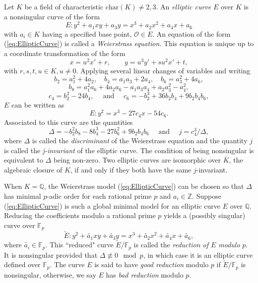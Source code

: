 Let $K$ be a field of characteristic $\text{char}(K) \neq 2,3$. An \textit{elliptic curve} $E$ over $K$ is a nonsingular curve of the form 
\begin{equation} \label{eq:EllipticCurve}
E: y^2 + a_1xy + a_3y = x^3 + a_2x^2 + a_4x + a_6
\end{equation}
with $a_i \in K$ having a specified base point, $\mathcal{O}\in E$. An equation of the form (\ref{eq:EllipticCurve}) is called a \textit{Weierstrass equation}. This equation is unique up to a coordinate transformation of the form
\[x = u^2x' + r, \quad\quad y = u^3y' + su^2x' + t, \]
with $r,s,t,u \in K, u\neq 0$. 
Applying several linear changes of variables and writing 
\[b_2 = a_1^2 + 4a_2, \quad b_4 = a_1a_3 + 2a_4, \quad b_6 = a_3^2 + 4a_6,\]
\[b_8 = a_1^2a_6 + 4a_2a_6 - a_1a_3a_4 + a_2a_3^2 - a_4^2,\]
\[ c_4 = b_2^2 - 24b_4, \quad \text{ and } \quad c_6 = -b_2^3 + 36b_2b_4 + 9b_2b_4b_6,\]
$E$ can be written as
\[E: y^2 = x^3 - 27c_4x - 54c_6.\]
Associated to this curve are the quantities 
\[\Delta = -b_2^2b_8 - 8b_4^3 - 27b_6^2 + 9b_2b_4b_6 \quad \text{ and } \quad j = c_4^3/\Delta,\]
where $\Delta$ is called the \textit{discriminant} of the Weierstrass equation and the quantity $j$ is called the \textit{j-invariant} of the elliptic curve. The condition of being nonsingular is equivalent to $\Delta$ being non-zero. Two elliptic curves are isomorphic over $\bar{K}$, the algebraic closure of $K$, if and only if they both have the same $j$-invariant.

When $K = \mathbb{Q}$, the Weierstrass model (\ref{eq:EllipticCurve}) can be chosen so that $\Delta$ has minimal $p$-adic order for each rational prime $p$ and $a_i \in \mathbb{Z}$. Suppose (\ref{eq:EllipticCurve}) is such a global minimal model for an elliptic curve $E$ over $\mathbb{Q}$. Reducing the coefficients modulo a rational prime $p$ yields a (possibly singular) curve over $\mathbb{F}_p$
\begin{equation}
\tilde{E}: y^2 + \tilde{a_1}xy + \tilde{a_3}y = x^3 + \tilde{a_2}x^2 + \tilde{a_4}x + \tilde{a_6},
\end{equation}
where $\tilde{a_i} \in \mathbb{F}_p$. This ``reduced" curve $\tilde{E}/\mathbb{F}_p$ is called the \textit{reduction of $E$ modulo} $p$. It is nonsingular provided that $\Delta \not \equiv 0 \mod{p}$, in which case it is an elliptic curve defined over $\mathbb{F}_p$. The curve $E$ is said to have \textit{good reduction} modulo $p$ if $\tilde{E}/\mathbb{F}_p$ is nonsingular, otherwise, we say $E$ has \textit{bad reduction} modulo $p$. 

